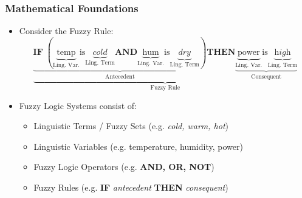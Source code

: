 \documentclass[
	10pt,
	t		%
]{beamer}
\begin{document}
\begin{frame}
	\frametitle{Mathematical Foundations}

	\begin{itemize}
		\item Consider the Fuzzy Rule:
		      \[
			      \underbrace{  \underbrace{\textbf{IF}  \;(\underbrace{\text{temp}}_{\text{Ling. Var.}} \text{is} \underbrace{\textit{cold}}_{\text{Ling. Term}}  \textbf{AND}  \underbrace{\text{hum}}_{\text{Ling. Var.}} \text{is} \underbrace{\textit{dry}}_{\text{Ling. Term}}) }_{\text{Antecedent}}
				      \textbf{THEN}  \underbrace{\underbrace{\text{power}}_{\text{Ling. Var.}} \text{is} \underbrace{\textit{high}}_{\text{Ling. Term}}}_{\text{Consequent}}
			      }_{\text{Fuzzy Rule}}
		      \]
		\item Fuzzy Logic Systems consist of:
		      \begin{itemize}
			      \item Linguistic Terms / Fuzzy Sets (e.g. \textit{cold, warm, hot})
			      \item Linguistic Variables (e.g. temperature, humidity, power)
			      \item Fuzzy Logic Operators (e.g. \textbf{AND, OR, NOT})
			      \item Fuzzy Rules (e.g. \textbf{IF} \textit{antecedent} \textbf{THEN} \textit{consequent})
		      \end{itemize}
	\end{itemize}
\end{frame}
\end{document}
